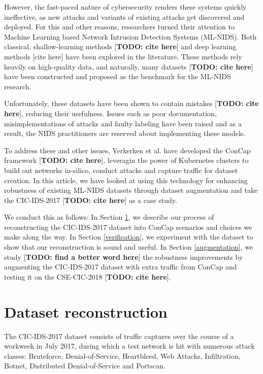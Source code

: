 \documentclass[conference]{IEEEtran}
\begin{document}
	However, the fast-paced nature of cybersecurity renders these systems quickly ineffective, as new attacks and variants of existing attacks get discovered and deployed. For this and other reasons, researchers turned their attention to Machine Learning based Network Intrusion Detection Systems (ML-NIDS). Both classical, shallow-learning methods [\textbf{TODO: cite here}] and deep learning methods [cite here] have been explored in the literature. These methods rely heavily on high-quality data, and naturally, many datasets [\textbf{TODO: cite here}] have been constructed and proposed as the benchmark for the ML-NIDS research. 
	
	Unfortunately, these datasets have been shown to contain mistakes [\textbf{TODO: cite here}], reducing their usefulness. Issues such as poor documentation, misimplementations of attacks and faulty labeling have been raised and as a result, the NIDS practitioners are reserved about implementing these models.
	
	To address these and other issues, Verkerken et al. have developed the ConCap framework [\textbf{TODO: cite here}], leveragin the power of Kubernetes clusters to build out networks in-silico, conduct attacks and capture traffic for dataset creation. In this article, we have looked at using this technology for enhancing robustness of existing ML-NIDS datasets through dataset augmentation and take the CIC-IDS-2017 [\textbf{TODO: cite here}] as a case study.
	
	We conduct this as follows: In Section \ref{dataset_reconstruction}, we describe our process of reconstructing the CIC-IDS-2017 dataset into ConCap scenarios and choices we make along the way. In Section \ref{verification}, we experiment with the dataset to show that our reconstruction is sound and useful. In Section \ref{augmentation}, we study [\textbf{TODO: find a better word here}] the robustness improvements by augmenting the CIC-IDS-2017 dataset with extra traffic from ConCap and testing it on the CSE-CIC-2018 [\textbf{TODO: cite here}].
	
	\section{Dataset reconstruction}\label{dataset_reconstruction}
	The CIC-IDS-2017 dataset consists of traffic captures over the course of a workweek in July 2017, during which a test network is hit with numerous attack classes: Bruteforce, Denial-of-Service, Heartbleed, Web Attacks, Infiltration, Botnet, Distributed Denial-of-Service and Portscan. 
	
\end{document}
